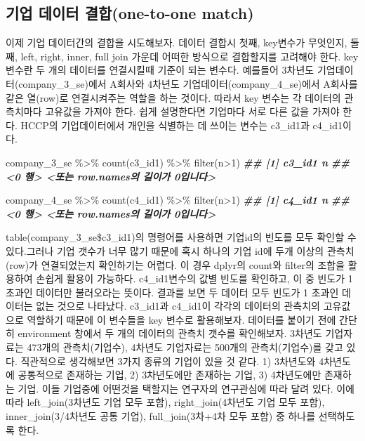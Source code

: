 \documentclass[
]{book}
\newenvironment{Shaded}{\begin{snugshade}}{\end{snugshade}}
\newcommand{\DecValTok}[1]{\textcolor[rgb]{0.00,0.00,0.81}{#1}}
\newcommand{\DocumentationTok}[1]{\textcolor[rgb]{0.56,0.35,0.01}{\textbf{\textit{#1}}}}
\newcommand{\FunctionTok}[1]{\textcolor[rgb]{0.00,0.00,0.00}{#1}}
\newcommand{\NormalTok}[1]{#1}
\newcommand{\SpecialCharTok}[1]{\textcolor[rgb]{0.00,0.00,0.00}{#1}}
\theoremstyle{definition}
\theoremstyle{definition}
\theoremstyle{definition}
\theoremstyle{definition}
\theoremstyle{remark}
\begin{document}
\hypertarget{uxae30uxc5c5-uxb370uxc774uxd130-uxacb0uxd569one-to-one-match}{%
\subsection{기업 데이터 결합(one-to-one match)}\label{uxae30uxc5c5-uxb370uxc774uxd130-uxacb0uxd569one-to-one-match}}

이제 기업 데이터간의 결합을 시도해보자. 데이터 결합시 첫째, key변수가 무엇인지, 둘째, left, right, inner, full join 가운데 어떠한 방식으로 결합할지를 고려해야 한다. key 변수란 두 개의 데이터를 연결시킬때 기준이 되는 변수다. 예를들어 3차년도 기업데이터(company\_3\_se)에서 A회사와 4차년도 기업데이터(company\_4\_se)에서 A회사를 같은 열(row)로 연결시켜주는 역할을 하는 것이다. 따라서 key 변수는 각 데이터의 관측치마다 고유값을 가져야 한다. 쉽게 설명한다면 기업마다 서로 다른 값을 가져야 한다. HCCP의 기업데이터에서 개인을 식별하는 데 쓰이는 변수는 c3\_id1과 c4\_id1이다.

\begin{Shaded}
\begin{Highlighting}[]
\NormalTok{company\_3\_se }\SpecialCharTok{\%\textgreater{}\%} 
  \FunctionTok{count}\NormalTok{(c3\_id1) }\SpecialCharTok{\%\textgreater{}\%} 
  \FunctionTok{filter}\NormalTok{(n}\SpecialCharTok{\textgreater{}}\DecValTok{1}\NormalTok{)}
\DocumentationTok{\#\# [1] c3\_id1 n     }
\DocumentationTok{\#\# \textless{}0 행\textgreater{} \textless{}또는 row.names의 길이가 0입니다\textgreater{}}

\NormalTok{company\_4\_se }\SpecialCharTok{\%\textgreater{}\%} 
  \FunctionTok{count}\NormalTok{(c4\_id1) }\SpecialCharTok{\%\textgreater{}\%} 
  \FunctionTok{filter}\NormalTok{(n}\SpecialCharTok{\textgreater{}}\DecValTok{1}\NormalTok{)}
\DocumentationTok{\#\# [1] c4\_id1 n     }
\DocumentationTok{\#\# \textless{}0 행\textgreater{} \textless{}또는 row.names의 길이가 0입니다\textgreater{}}
\end{Highlighting}
\end{Shaded}

table(company\_3\_se\$c3\_id1)의 명령어를 사용하면 기업id의 빈도를 모두 확인할 수 있다.그러나 기업 갯수가 너무 많기 때문에 혹시 하나의 기업 id에 두개 이상의 관측치(row)가 연결되었는지 확인하기는 어렵다. 이 경우 dplyr의 count와 filter의 조합을 활용하여 손쉽게 활용이 가능하다. c4\_id1변수의 값별 빈도를 확인하고, 이 중 빈도가 1 초과인 데이터만 불러오라는 뜻이다. 결과를 보면 두 데이터 모두 빈도가 1 초과인 데이터는 없는 것으로 나타났다.
c3\_id1과 c4\_id1이 각각의 데이터의 관측치의 고유값으로 역할하기 때문에 이 변수들을 key 변수로 활용해보자. 데이터를 붙이기 전에 간단히 environment 창에서 두 개의 데이터의 관측치 갯수를 확인해보자. 3차년도 기업자료는 473개의 관측치(기업수), 4차년도 기업자료는 500개의 관측치(기업수)를 갖고 있다. 직관적으로 생각해보면 3가지 종류의 기업이 있을 것 같다. 1) 3차년도와 4차년도에 공통적으로 존재하는 기업, 2) 3차년도에만 존재하는 기업, 3) 4차년도에만 존재하는 기업. 이들 기업중에 어떤것을 택할지는 연구자의 연구관심에 따라 달려 있다. 이에 따라 left\_join(3차년도 기업 모두 포함), right\_join(4차년도 기업 모두 포함), inner\_join(3/4차년도 공통 기업), full\_join(3차+4차 모두 포함) 중 하나를 선택하도록 한다.
\end{document}
